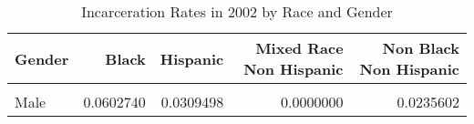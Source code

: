 \begin{table}[H]

\caption{\label{tab:tab:summarystats}Incarceration Rates in 2002 by Race and Gender}
\centering
\begin{tabular}[t]{lrrrr}
\toprule
Gender & Black & Hispanic & Mixed Race Non Hispanic & Non Black Non Hispanic\\
\midrule
\cellcolor{gray!6}{Female} & \cellcolor{gray!6}{0.0079225} & \cellcolor{gray!6}{0.0066225} & \cellcolor{gray!6}{0.0238095} & \cellcolor{gray!6}{0.0059798}\\
Male & 0.0602740 & 0.0309498 & 0.0000000 & 0.0235602\\
\bottomrule
\end{tabular}
\end{table}
